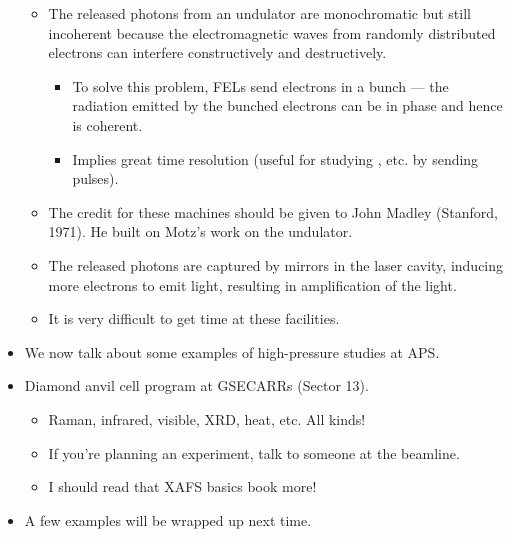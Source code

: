 \documentclass[../notes.tex]{subfiles}
\begin{document}
\begin{itemize}
\begin{itemize}
\begin{itemize}
        \end{itemize}
        \item The released photons from an undulator are monochromatic but still incoherent because the electromagnetic waves from randomly distributed electrons can interfere constructively and destructively.
        \begin{itemize}
            \item To solve this problem, FELs send electrons in a bunch --- the radiation emitted by the bunched electrons can be in phase and hence is coherent.
            \item Implies great time resolution (useful for studying , etc. by sending pulses).
        \end{itemize}
        \item The credit for these machines should be given to John Madley (Stanford, 1971). He built on Motz's work on the undulator.
        \item The released photons are captured by mirrors in the laser cavity, inducing more electrons to emit light, resulting in amplification of the light.
        \item It is very difficult to get time at these facilities.
    \end{itemize}
    \item We now talk about some examples of high-pressure studies at APS.
    \item Diamond anvil cell program at GSECARRs (Sector 13).
    \begin{itemize}
        \item Raman, infrared, visible, XRD, heat, etc. All kinds!
        \item If you're planning an experiment, talk to someone at the beamline.
        \item I should read that XAFS basics book more!
    \end{itemize}
    \item A few examples will be wrapped up next time.
\end{itemize}
\end{document}
